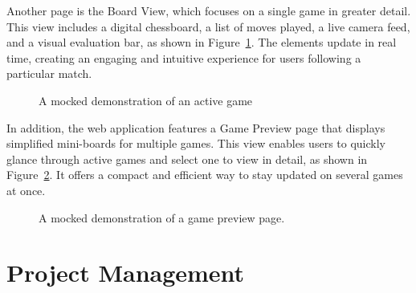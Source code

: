 Another page is the Board View, which focuses on a single game in greater detail. This view includes a digital chessboard, a list of moves played, a live camera feed, and a visual evaluation bar, as shown in Figure~\ref{fig:board-view-mocked}. The elements update in real time, creating an engaging and intuitive experience for users following a particular match. \\

\begin{figure}[h!] \centering {}\caption[Display of a board]{A mocked demonstration of an active game}\label{fig:board-view-mocked} \end{figure}

In addition, the web application features a Game Preview page that displays simplified mini-boards for multiple games. This view enables users to quickly glance through active games and select one to view in detail, as shown in Figure~\ref{fig:game-preview}. It offers a compact and efficient way to stay updated on several games at once. \\

\begin{figure}[h!] \centering {}\caption[Preview of active games]{A mocked demonstration of a game preview page.}\label{fig:game-preview} \end{figure}

\section{Project Management}
\label{sec:results-project-management}

